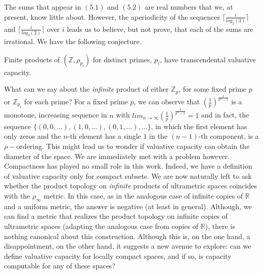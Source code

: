 
The sums that appear in $(5.1)$ and $(5.2)$ are real numbers that we, at present, know  little about. However, the aperiodicity of the sequences $\lceil\frac{i}{log_2(3)}\rceil$ and $\lceil\frac{i}{log_3(2)}\rceil$ over $i$ leads us to believe, but not prove, that each of the sums are irrational. We have the following conjecture.\\

\begin{conjecture} Finite products of $(\mathbb{Z}, \rho_{p_i})$ for distinct primes, $p_i$, have transcendental valuative capacity.\\ \end{conjecture}
 
What can we say about the \textit{infinite} product of either $\mathbb{Z}_{p}$, for some fixed prime $p$ or $\mathbb{Z}_{p_i}$ for each prime? For a fixed prime $p$,  we can observe that $(\frac{1}{p})^{\frac{1}{p^n-1}}$ is a monotone, increasing sequence in $n$ with $ lim_{n\to\infty} (\frac{1}{p})^{\frac{1}{p^n-1}} =  1$ and in fact, the sequence $\{(0,0,\ldots), (1,0,\ldots), (0,1,\ldots), \ldots\}$, in which the first element has only zeros and the $n$-th element has a single $1$ in the $(n-1)$-th component, is a $\rho-$ordering. This might lead us to wonder if valuative capacity can obtain the diameter of the space. We are immediately met with a problem however.\\

Compactness has played no small role in this work. Indeed, we have a definition of valuative capacity only for compact subsets. 
We are now naturally left to ask whether the product topology on \textit{infinite} products of ultrametric spaces coincides with the $\rho_\infty$ metric. In this case, as in the analogous case of infinite copies of $\mathbb{R}$ and a uniform metric, the answer is negative (at least in general). Although, we can find a metric that realizes the product topology on infinite copies of ultrametric spaces (adapting the analogous case from copies of $\mathbb{R}$), there is nothing canonical about this construction. Although this is, on the one hand, a disappointment, on the other hand, it suggests a new avenue to explore: can we define valuative capacity for locally compact spaces, and if so, is capacity computable for any of these spaces?

